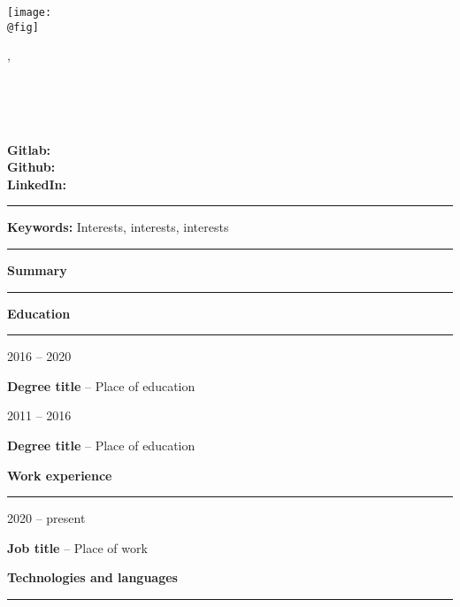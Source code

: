 \documentclass[10pt,A4]{article}
\author{Jane Doe}
\date{\today}
\makeatletter
\newcommand{\cvsection}[1]
{
    \begin{center}
	    \large\textcolor{maincolor}{\textbf{#1}}
	    \vspace{0.2cm}
	    \textcolor{sepcolor}{\hrule}
    \end{center}
}
\newcommand{\cvitem}[4] %
{
\begin{minipage}[t]{.15\textwidth} 
\centering
   \textcolor{maincolor}{#1} 
\end{minipage}
    \hfill
    \noindent
\begin{minipage}[t]{.82\textwidth}
{\textbf{#2}} -- \textcolor{maincolor}{#3}\\
{#4}
\end{minipage}
\vspace{0.2cm}
}
\newcommand{\cvkeywords}[1] 
{
\centering
\vspace{0.4cm}
\textcolor{sepcolor}{\hrule}
{\textcolor{maincolor}{\large\textbf{Keywords: }}#1}\\
\textcolor{sepcolor}{\hrule}
\raggedright
}
\newcommand{\cvtitle}
{
\begin{minipage}{.30\textwidth}
\centering
    \texttt{[image: \\@fig]}
\end{minipage}
    \hfill
    \noindent
\begin{minipage}{.68\textwidth}
\raggedright 
    {\textcolor{maincolor}{\Large\textbf{\@author}, \@degree}}\\
    \vspace{0.2cm}
    \begin{minipage}{.48\textwidth}
	    {{\@date}}\\
	    {{\@address}}\\
        {{\@phone}}\\
	    {{\@email}}
	\end{minipage}
    \hfill
    \noindent
    \begin{minipage}{.48\textwidth}
        \raggedright
	    \textbf{Gitlab:} \@gitlab\\
	    \textbf{Github:} \@github\\
	    \textbf{LinkedIn:} \@linkedin
	\end{minipage}
	\vspace{0.2cm}
\end{minipage}
\vspace{0.2cm}
}
\makeatother
\begin{document}
\cvtitle
\cvkeywords{Interests, interests, interests}
\cvsection{Summary}
\lipsum[1-1]

\cvsection{Education}
\cvitem{2016 -- 2020}{Degree title}{Place of education}{\lipsum[1-1]}
\cvitem{2011 -- 2016}{Degree title}{Place of education}{\lipsum[1-1]}
\clearpage %
\cvsection{Work experience}
\cvitem{2020 -- present}{Job title}{Place of work}{\lipsum[1-1]}
\cvsection{Technologies and languages}
{\lipsum[1-1]}
\end{document}
